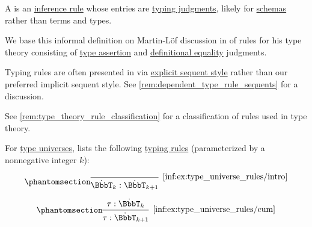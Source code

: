 \begin{concept}\label{con:typing_rule}
  A  is an \hyperref[def:inference_rule]{inference rule} whose entries are \hyperref[rem:typing_judgments]{typing judgments}, likely for \hyperref[con:schemas_and_instances]{schemas} rather than terms and types.
\end{concept}
\begin{comments}
  \item We base this informal definition on Martin-L\"of discussion in \cite{MartinLöf1984IntuitionisticTypeTheory} of rules for his type theory consisting of \hyperref[def:type_assertion]{type assertion} and \hyperref[con:equality]{definitional equality} judgments.

  \item Typing rules are often presented in via \hyperref[rem:natural_deduction_explicit_sequents]{explicit sequent style} rather than our preferred implicit sequent style. See \cref{rem:dependent_type_rule_sequents} for a discussion.

  \item See \cref{rem:type_theory_rule_classification} for a classification of rules used in type theory.
\end{comments}

\begin{example}\label{ex:type_universe_rules}
  For \hyperref[con:type_universe]{type universes}, \cite[\S A.2.3]{UnivalentFoundationsProgram2024OctoberHoTT} lists the following \hyperref[con:typing_rule]{typing rules} (parameterized by a nonnegative integer \( k \)):
  \begin{paracol}{2}
    \begin{leftcolumn}
      \begin{equation*}\taglabel[\ensuremath{ \BbbT_+ }]{inf:ex:type_universe_rules/intro}
        \begin{prooftree}
          \infer0[\ref{inf:ex:type_universe_rules/intro}]{ \syn\BbbT_k: \syn\BbbT_{k+1} }
        \end{prooftree}
      \end{equation*}
    \end{leftcolumn}

    \begin{rightcolumn}
      \begin{equation*}\taglabel[\ensuremath{ \BbbT_{\logic{cum}} }]{inf:ex:type_universe_rules/cum}
        \begin{prooftree}
          \hypo{ \tau: \syn\BbbT_k }
          \infer1[\ref{inf:ex:type_universe_rules/cum}]{ \tau: \syn\BbbT_{k+1} }
        \end{prooftree}
      \end{equation*}
    \end{rightcolumn}
  \end{paracol}
\end{example}

